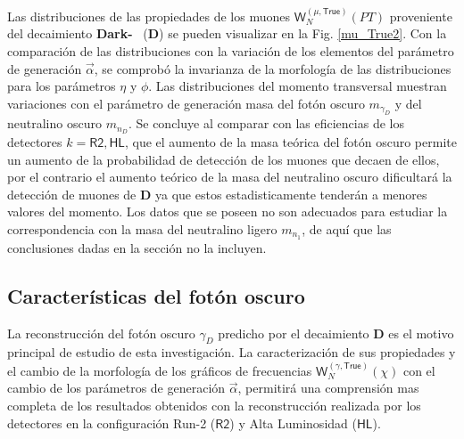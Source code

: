 Las distribuciones de las propiedades de los muones $\textsf{W}^{(\mu,\textsf{True})}_N (PT)$ proveniente del decaimiento  \textbf{Dark-}\SUSY ~ (\MSSM\textbf{D}) se pueden visualizar en la Fig. \ref{mu_True2}. Con la comparación de las distribuciones con la variación de los elementos del parámetro de generación $\vec{\alpha}$, se comprobó la invarianza de la morfología de las distribuciones para los parámetros $\eta$ y $\phi$. Las distribuciones del momento transversal muestran variaciones con el parámetro de generación masa del fotón oscuro $m_{\gamma_D}$ y del neutralino oscuro $m_{n_D}$. Se concluye al comparar con las eficiencias de los detectores $k=\textsf{R2}, \textsf{HL}$, que el aumento de la masa teórica del fotón oscuro permite un aumento de la probabilidad de detección de los muones que decaen de ellos, por el contrario el aumento teórico de la masa del neutralino oscuro dificultará la detección de muones de \MSSM\textbf{D} ya que estos estadisticamente tenderán a menores valores del momento. Los datos que se poseen no son adecuados para estudiar la correspondencia con la masa del neutralino ligero $m_{n_1}$, de aquí que las conclusiones dadas en la sección no la incluyen.




\subsection{Características del fotón oscuro}
La reconstrucción del fotón oscuro $\gamma_D$ predicho por el decaimiento \MSSM\textbf{D} es el motivo principal de estudio de esta investigación. La caracterización de sus propiedades y el cambio de la morfología de los gráficos de frecuencias $\textsf{W}^{(\gamma , \textsf{True})}_N (\chi)$ con el cambio de los parámetros de generación $\vec{\alpha}$, permitirá una comprensión mas completa de los resultados obtenidos con la reconstrucción realizada por los detectores en la configuración Run-2 ($\textsf{R2}$) y Alta Luminosidad ($\textsf{HL}$).


